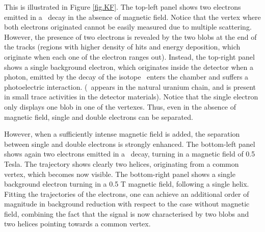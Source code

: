 This is illustrated in Figure \ref{fig.KF}. The top-left panel shows two electrons emitted in a \bbonu\ decay in the absence of magnetic field. Notice that the vertex where both electrons originated cannot be easily measured due to multiple scattering. However, the presence of two electrons is revealed by the two blobs at the end of the tracks (regions with higher density of hits and energy deposition, which originate when each one of the electron ranges out). Instead, the top-right panel shows a single background electron, which originates inside the detector when a photon, emitted by the decay of the isotope \BI\ enters the chamber and suffers a photoelectric interaction. (\BI\ appears in the natural uranium chain, and is present in small trace activities in the detector materials). Notice that the single electron only displays one blob in one of the vertexes. Thus, even in the absence of magnetic field, single and double electrons can be separated. 

However, when a sufficiently intense magnetic field is added, the separation between single and double electrons is strongly enhanced. The bottom-left panel shows again two electrons emitted in a \bbonu\ decay, turning in a magnetic field of 0.5 Tesla. The trajectory shows clearly two helices, originating from a common vertex, which becomes now visible. The bottom-right panel shows a single background electron turning in a 0.5 T magnetic field, following a single helix. Fitting the trajectories of the electrons, one can achieve an additional order of magnitude in background reduction with respect to the case without magnetic field, combining the fact that the signal is now characterised by two blobs and two helices pointing towards a common vertex.    

